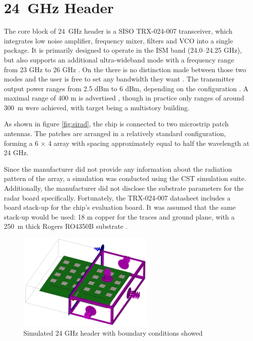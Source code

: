 \section{24~GHz Header}

The core block of 24~GHz header is a SISO TRX-024-007 transceiver, which integrates low noise amplifier, frequency mixer, filters and VCO into a single package.
It is primarily designed to operate in the ISM band (24.0--24.25 GHz), but also supports an additional ultra-wideband mode with a frequency range from 23 GHz to 26 GHz \cite{siradTRX24}.
On the \sirad there is no distinction made between  those two modes and the user is free to set any bandwidth they want \cite{siradPRO}.
The transmitter output power ranges from 2.5 dBm to 6 dBm, depending on the configuration \cite{siradTRX24}.
A maximal range of 400 m is advertised \cite{siradMANOld}, though in practice only ranges of around 300~m were achieved, with target being a multistory building.

As shown in figure \ref{fig:sirad}, the chip is connected to two microstrip patch antennas.
The patches are arranged in a relatively standard configuration, forming a 6 $\times$ 4 array with spacing approximately equal to half the wavelength at 24 GHz.

Since the manufacturer did not provide any information about the radiation pattern of the array, a simulation was conducted using the CST simulation suite.
Additionally, the manufacturer did not disclose the substrate parameters for the radar board specifically.
Fortunately, the TRX-024-007 datasheet includes a board stack-up for the chip's evaluation board.
It was assumed that the same stack-up would be used: 18 \textmu m copper for the traces and ground plane, with a 250~\textmu m thick Rogers RO4350B substrate \cite{siradTRX24}.

\begin{figure}[ht!]
  \centering
  \includegraphics[width=0.6\textwidth]{../img/boundaries.png}
  \caption[Simulated 24 GHz header with boundary conditions showed]{Simulated 24 GHz header with boundary conditions showed}
  \label{fig:boundaries}
\end{figure}

